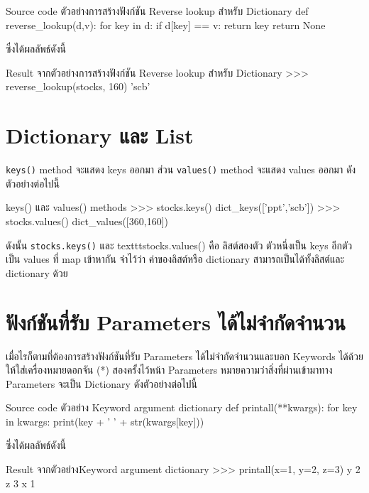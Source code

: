 \begin{codelist}{Source code ตัวอย่างการสร้างฟังก์ชัน Reverse lookup สำหรับ Dictionary}{}
def reverse_lookup(d,v):
    for key in d:
        if d[key] == v: return key
    return None
\end{codelist}

ซึ่งได้ผลลัพธ์ดังนี้

\begin{codelist}{Result จากตัวอย่างการสร้างฟังก์ชัน Reverse lookup สำหรับ Dictionary}{}
>>> reverse_lookup(stocks, 160)
'scb'
\end{codelist}


\section{Dictionary และ List}

\texttt{keys()} method จะแสดง keys ออกมา ส่วน \texttt{values()} method จะแสดง values ออกมา ดังตัวอย่างต่อไปนี้

\begin{codelist}{keys() และ values() methods}{}
>>> stocks.keys()
dict_keys(['ppt','scb'])
>>> stocks.values()
dict_values([360,160])
\end{codelist}


ดังนั้น \texttt{stocks.keys()} และ texttt{stocks.values()} คือ ลิสต์สองตัว ตัวหนึ่งเป็น keys อีกตัวเป็น values ที่ map เข้าหากัน จำไว้ว่า ค่าของลิสต์หรือ dictionary สามารถเป็นได้ทั้งลิสต์และ dictionary ด้วย

\section{ฟังก์ชันที่รับ Parameters ได้ไม่จำกัดจำนวน }

เมื่อไรก็ตามที่ต้องการสร้างฟังก์ชันที่รับ Parameters ได้ไม่จำกัดจำนวนและบอก Keywords ได้ด้วย ให้ใส่เครื่องหมายดอกจัน (*) สองครั้งไว้หน้า Parameters หมายความว่าสิ่งที่ผ่านเข้ามาทาง Parameters จะเป็น Dictionary ดังตัวอย่างต่อไปนี้

\begin{codelist}{Source code ตัวอย่าง Keyword argument dictionary}{}
def printall(**kwargs):
    for key in kwargs:
        print(key + ' ' + str(kwargs[key]))
\end{codelist}

ซึ่งได้ผลลัพธ์ดังนี้

\begin{codelist}{Result จากตัวอย่างKeyword argument dictionary}{}
>>> printall(x=1, y=2, z=3)
y 2
z 3
x 1
\end{codelist}

